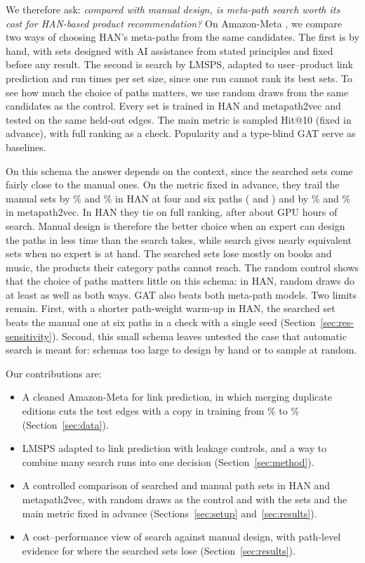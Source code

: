 We therefore ask: \emph{compared with manual design, is meta-path search worth its cost for
HAN-based product recommendation?} On Amazon-Meta \citep{leskovec2007viral}, we compare two ways of
choosing HAN's meta-paths from the same  candidates. The first is by hand, with
sets designed with AI assistance from stated principles and fixed before any result. The second is
search by LMSPS, adapted to user--product link prediction and run  times per set
size, since one run cannot rank its best sets. To see how much the choice of paths matters, we use
random draws from the same candidates as the control. Every set is trained in HAN and metapath2vec
\citep{dong2017metapath2vec} and tested on the same held-out edges. The main metric is sampled
Hit@10 (fixed in advance), with full ranking as a check. Popularity and a type-blind GAT serve as
baselines.

On this schema the answer depends on the context, since the searched sets come fairly close to the
manual ones. On the metric fixed in advance, they trail the manual sets by \%
and \% in HAN at four and six paths ( and
) and by \% and \% in metapath2vec. In
HAN they tie on full ranking, after about  GPU hours of search. Manual design is
therefore the better choice when an expert can design the paths in less time than the search takes,
while search gives nearly equivalent sets when no expert is at hand. The searched sets lose mostly
on books and music, the products their category paths cannot reach. The random control shows that
the choice of paths matters little on this schema: in HAN, random draws do at least as well as both
ways. GAT also beats both meta-path models. Two limits remain. First, with a shorter path-weight
warm-up in HAN, the searched set beats the manual one at six paths in a check with a single seed
(Section~\ref{sec:res-sensitivity}). Second, this small schema leaves untested the case that
automatic search is meant for: schemas too large to design by hand or to sample at random.

Our contributions are:
\begin{itemize}
  \item A cleaned Amazon-Meta for link prediction, in which merging duplicate editions cuts the
        test edges with a copy in training from \% to
        \% (Section~\ref{sec:data}).
  \item LMSPS adapted to link prediction with leakage controls, and a way to combine many search
        runs into one decision (Section~\ref{sec:method}).
  \item A controlled comparison of searched and manual path sets in HAN and metapath2vec, with
        random draws as the control and with the sets and the main metric fixed in advance
        (Sections~\ref{sec:setup} and~\ref{sec:results}).
  \item A cost--performance view of search against manual design, with path-level evidence for
        where the searched sets lose (Section~\ref{sec:results}).
\end{itemize}
